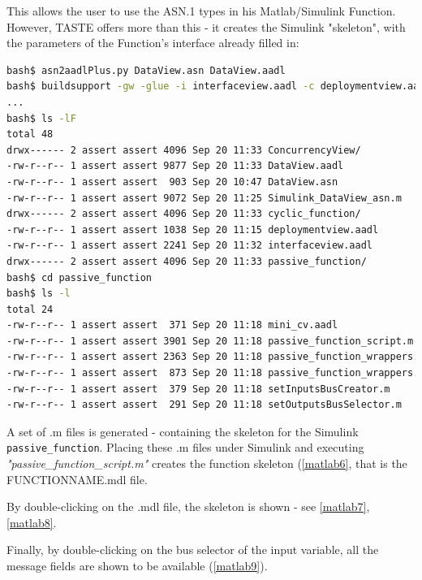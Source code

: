 \documentclass[11pt]{book}
\begin{document}
This allows the user to use the ASN.1 types in his Matlab/Simulink Function. However, TASTE offers more than this -
it creates the Simulink "skeleton", with the parameters of the Function's interface already filled in:

\begin{lstlisting}[language=bash]
bash$ asn2aadlPlus.py DataView.asn DataView.aadl
bash$ buildsupport -gw -glue -i interfaceview.aadl -c deploymentview.aadl -d DataView.aadl
...
bash$ ls -lF
total 48
drwx------ 2 assert assert 4096 Sep 20 11:33 ConcurrencyView/
-rw-r--r-- 1 assert assert 9877 Sep 20 11:33 DataView.aadl
-rw-r--r-- 1 assert assert  903 Sep 20 10:47 DataView.asn
-rw-r--r-- 1 assert assert 9072 Sep 20 11:25 Simulink_DataView_asn.m
drwx------ 2 assert assert 4096 Sep 20 11:33 cyclic_function/
-rw-r--r-- 1 assert assert 1038 Sep 20 11:15 deploymentview.aadl
-rw-r--r-- 1 assert assert 2241 Sep 20 11:32 interfaceview.aadl
drwx------ 2 assert assert 4096 Sep 20 11:33 passive_function/
bash$ cd passive_function
bash$ ls -l
total 24
-rw-r--r-- 1 assert assert  371 Sep 20 11:18 mini_cv.aadl
-rw-r--r-- 1 assert assert 3901 Sep 20 11:18 passive_function_script.m
-rw-r--r-- 1 assert assert 2363 Sep 20 11:18 passive_function_wrappers.adb
-rw-r--r-- 1 assert assert  873 Sep 20 11:18 passive_function_wrappers.ads
-rw-r--r-- 1 assert assert  379 Sep 20 11:18 setInputsBusCreator.m
-rw-r--r-- 1 assert assert  291 Sep 20 11:18 setOutputsBusSelector.m
\end{lstlisting}

A set of .m files is generated - containing the skeleton for the Simulink {\tt passive\_function}. 
Placing these .m files under Simulink and executing {\em "passive\_function\_script.m"} creates the
function skeleton (\ref{matlab6}, that is the FUNCTIONNAME.mdl file. 

By double-clicking on the .mdl file, the skeleton is shown - see \ref{matlab7}, \ref{matlab8}.

Finally, by double-clicking on the bus selector of the input variable, all the message fields are shown to be available (\ref{matlab9}).
\end{document}
